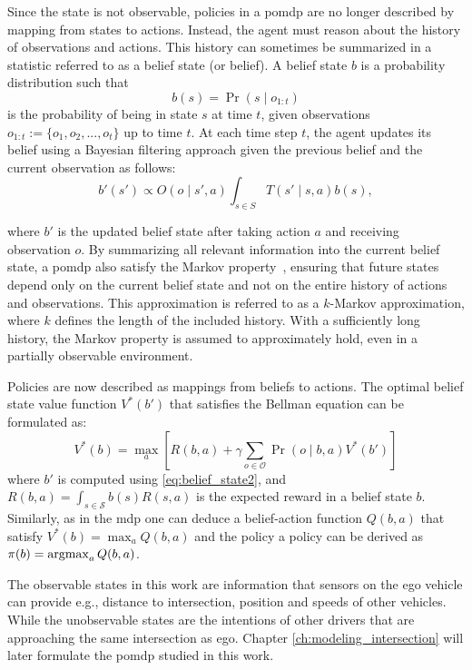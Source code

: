 Since the state is not observable, policies in a \gls{pomdp} are no longer described by mapping from states to actions. Instead, the agent must reason about the history of observations and actions. This history can sometimes be summarized in a statistic referred to as a belief state (or belief). A belief state $b$ is a probability distribution such that
\begin{equation}
b(s) = \Pr(s \mid o_{1:t})
\label{eq:belief_state}
\end{equation}
is the probability of being in state $s$ at time $t$, given observations $o_{1:t}:=\{o_1,o_2,...,o_t\}$ up to time $t$. 
At each time step $t$, the agent updates its belief using a Bayesian filtering approach given the previous belief and the current observation as follows:
\begin{equation}\label{eq:belief_state2}
    b'(s') \propto O(o \mid s', a) \int_{s \in S}T(s' \mid s,a)b(s),
\end{equation}

where $b'$ is the updated belief state after taking action $a$ and receiving observation $o$. By summarizing all relevant information into the current belief state, a \gls{pomdp} also satisfy the Markov property~\cite[Ch. 17]{Sutton2018}, ensuring that future states depend only on the current belief state and not on the entire history of actions and observations. This approximation is referred to as a $k$-Markov approximation, where $k$ defines the length of the included history. With a sufficiently long history, the Markov property is assumed to approximately hold, even in a partially observable environment.

Policies are now described as mappings from beliefs to actions. The optimal belief state value function $V^*(b')$ that satisfies the Bellman equation can be formulated as: 
\begin{equation}
    V^*(b)= \max_{a} \left[ R(b, a) + \gamma \sum_{o \in \mathcal{O}} \Pr(o \mid b,a) V^*(b') \right]
    \label{eq:belief_bellman}
\end{equation}
where $b'$ is computed using \eqref{eq:belief_state2}, and $R(b,a)=\int_{s \in \mathcal{S}} b(s)R(s,a)$ is the expected reward in a belief state $b$. Similarly, as in the \gls{mdp} one can deduce a belief-action function $Q(b,a)$ that satisfy $V^*(b)=\max_a Q(b,a)$ and the policy a policy can be derived as $\pi(b) = \operatorname*{argmax}_a Q(b,a)$.

The observable states in this work are information that sensors on the ego vehicle can provide e.g., distance to intersection, position and speeds of other vehicles. While the unobservable states are the intentions of other drivers that are approaching the same intersection as ego. Chapter \ref{ch:modeling_intersection} will later formulate the \gls{pomdp} studied in this work.

